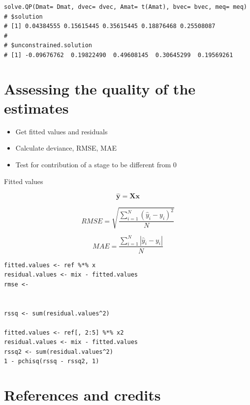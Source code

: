 \documentclass[11pt, fleqn]{article}
\begin{document}
\begin{Verbatim}[formatcom=\color{violet}, fontsize=\small]
solve.QP(Dmat= Dmat, dvec= dvec, Amat= t(Amat), bvec= bvec, meq= meq)
# $solution
# [1] 0.04384555 0.15615445 0.35615445 0.18876468 0.25508087
#
# $unconstrained.solution
# [1] -0.09676762  0.19822490  0.49608145  0.30645299  0.19569261
\end{Verbatim}

\section{Assessing the quality of the estimates}

\begin{itemize}
    \item Get fitted values and residuals
    \item Calculate deviance, RMSE, MAE
    \item Test for contribution of a stage to be different from 0
\end{itemize}

Fitted values

\begin{equation}
    \mathbf{\hat y} = \mathbf{X} \mathbf{x}
\end{equation}

\begin{equation}
RMSE = \sqrt{\frac{\sum_{i=1}^N (\hat y_i - y_i)^2}{N}}
\end{equation}

\begin{equation}
MAE = \frac{\sum_{i=1}^N\left| \hat y_i - y_i\right|}{N}
\end{equation}

\begin{Verbatim}[formatcom=\color{violet}, fontsize=\small]
fitted.values <- ref %*% x
residual.values <- mix - fitted.values
rmse <- 


rssq <- sum(residual.values^2)

fitted.values <- ref[, 2:5] %*% x2
residual.values <- mix - fitted.values
rssq2 <- sum(residual.values^2)
1 - pchisq(rssq - rssq2, 1)
\end{Verbatim}

\section{References and credits}
\end{document}
